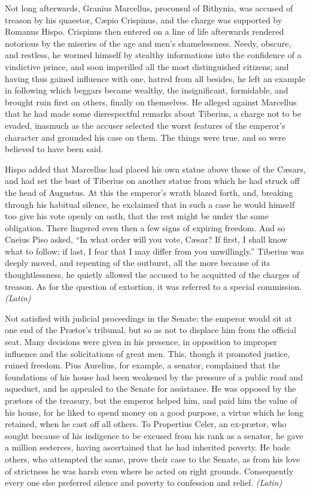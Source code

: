 
Not long afterwards, Granius Marcellus, proconsul of Bithynia, was accused of treason by his quaestor, Cæpio Crispinus, and the charge was supported by Romanus Hispo. Crispinus then entered on a line of life afterwards rendered notorious by the miseries of the age and men's shamelessness. Needy, obscure, and restless, he wormed himself by stealthy informations into the confidence of a vindictive prince, and soon imperilled all the most distinguished citizens; and having thus gained influence with one, hatred from all besides, he left an example in following which beggars became wealthy, the insignificant, formidable, and brought ruin first on others, finally on themselves. He alleged against Marcellus that he had made some disrespectful remarks about Tiberius, a charge not to be evaded, inasmuch as the accuser selected the worst features of the emperor's character and grounded his case on them. The things were true, and so were believed to have been said.

Hispo added that Marcellus had placed his own statue above those of the Cæsars, and had set the bust of Tiberius on another statue from which he had struck off the head of Augustus. At this the emperor's wrath blazed forth, and, breaking through his habitual silence, he exclaimed that in such a case he would himself too give his vote openly on oath, that the rest might be under the same obligation. There lingered even then a few signs of expiring freedom. And so Cneius Piso asked, ``In what order will you vote, Cæsar? If first, I shall know what to follow; if last, I fear that I may differ from you unwillingly.'' Tiberius was deeply moved, and repenting of the outburst, all the more because of its thoughtlessness, he quietly allowed the accused to be acquitted of the charges of treason. As for the question of extortion, it was referred to a special commission. \emph{(Latin)}


Not satisfied with judicial proceedings in the Senate: the emperor would sit at one end of the Prætor's tribunal, but so as not to displace him from the official seat. Many decisions were given in his presence, in opposition to improper influence and the solicitations of great men. This, though it promoted justice, ruined freedom. Pius Aurelius, for example, a senator, complained that the foundations of his house had been weakened by the pressure of a public road and aqueduct, and he appealed to the Senate for assistance. He was opposed by the prætors of the treasury, but the emperor helped him, and paid him the value of his house, for he liked to spend money on a good purpose, a virtue which he long retained, when he cast off all others. To Propertius Celer, an ex-prætor, who sought because of his indigence to be excused from his rank as a senator, he gave a million sesterces, having ascertained that he had inherited poverty. He bade others, who attempted the same, prove their case to the Senate, as from his love of strictness he was harsh even where he acted on right grounds. Consequently every one else preferred silence and poverty to confession and relief. \emph{(Latin)}

